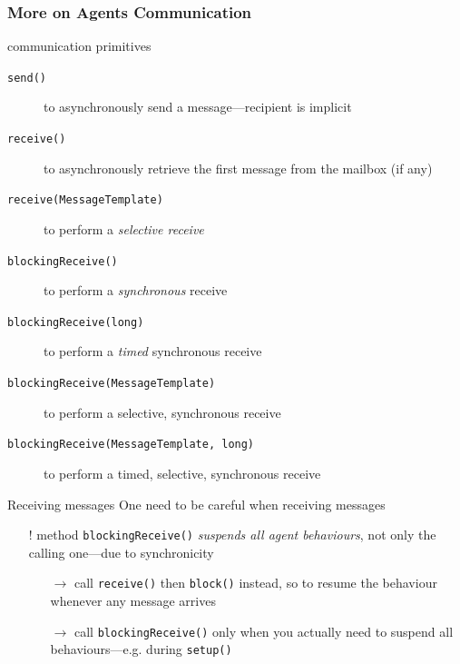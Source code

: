 \documentclass{beamer}\mode<presentation>{\usetheme{AMSCesenaPurpleAndGold}}
\begin{document}
\begin{frame}[c,allowframebreaks]\frametitle{More on Agents Communication}
    \begin{block}{\jade{} communication primitives}
        \begin{description}
            \item[\texttt{send()}] to \alert{asynchronously send} a message---recipient is implicit
            \item[\texttt{receive()}] to \alert{asynchronously retrieve} the first message from the mailbox (if any)
            \item[\texttt{receive(MessageTemplate)}] to perform a \emph{selective receive}
            \item[\texttt{blockingReceive()}] to perform a \emph{synchronous} receive
            \item[\texttt{blockingReceive(long)}] to perform a \emph{timed} synchronous receive
            \item[\texttt{blockingReceive(MessageTemplate)}] to perform a selective, synchronous receive
            \item[\texttt{blockingReceive(MessageTemplate, long)}] to perform a timed, selective, synchronous receive
        \end{description}
    \end{block}
    \begin{block}{Receiving messages}
        One need to be careful when receiving messages
        \begin{itemize}
            \item[!] method \texttt{blockingReceive()} \emph{suspends all agent behaviours}, not only the calling one---due to synchronicity
            \begin{itemize}
                \item[$\rightarrow$] call \texttt{receive()} then \texttt{block()} instead, so to resume the behaviour whenever any message arrives
                \item[$\rightarrow$] call \texttt{blockingReceive()} only when you actually need to suspend all behaviours---e.g. during \texttt{setup()}

\end{itemize}
\end{itemize}
\end{block}
\end{frame}
\end{document}
